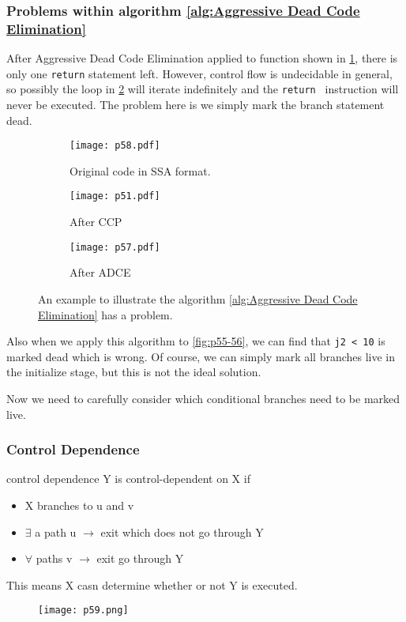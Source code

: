 \subsubsection{Problems within algorithm \ref{alg:Aggressive Dead Code Elimination}}
After Aggressive Dead Code Elimination applied to function  shown in \ref{fig:p58}, there is only one \texttt{return} statement left.
However, control flow is undecidable in general, so possibly the loop in \ref{fig:pp51} will iterate indefinitely and the \texttt{return } instruction will never be executed.
The problem here is we simply mark the branch statement dead.
\begin{figure}[H]
	\centering
	\begin{subfigure}{0.5\textwidth}
		\centering
		\texttt{[image: p58.pdf]}
		\caption{Original code in SSA format. }
		\label{fig:p58}
	\end{subfigure}
	\begin{subfigure}{0.5\textwidth}
		\centering
		\texttt{[image: p51.pdf]}
		\caption{After CCP}
		\label{fig:pp51}
	\end{subfigure}
	\begin{subfigure}{0.5\textwidth}
		\centering
		\texttt{[image: p57.pdf]}
		\caption{After ADCE}
		\label{fig:p57}
	\end{subfigure}
	\caption{An example to illustrate the algorithm \ref{alg:Aggressive Dead Code Elimination} has a problem.}
	\label{fig:p51-58}
\end{figure}


Also when we apply this algorithm to \ref{fig:p55-56}, we can find that \texttt{j2 < 10} is marked dead which is wrong. Of course,
we can simply mark all branches live in the initialize stage, but this is not the ideal solution.


Now we need to carefully consider which conditional branches need to be marked live.



\subsubsection{Control Dependence}

\begin{definition}{control dependence}
	Y is control-dependent on X if
	\begin{itemize}
		\item X branches to u and v
		\item $\exists$ a path u $\rightarrow$ exit which does not go through Y
		\item $\forall$ paths v  $\rightarrow$ exit go through Y
	\end{itemize}
	This means X casn determine whether or not Y is executed.
	\begin{figure}[H]
		\centering
		\texttt{[image: p59.png]}

	\end{figure}
\end{definition}


